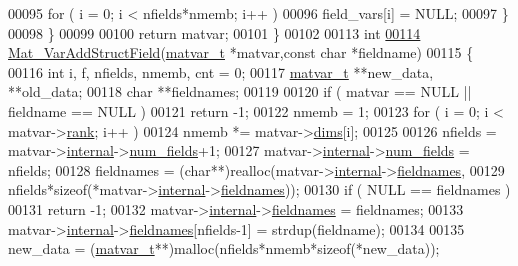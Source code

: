 \begin{DoxyCode}
00095             for ( i = 0; i < nfields*nmemb; i++ )
00096                 field\_vars[i] = NULL;
00097         \}
00098     \}
00099 
00100     \textcolor{keywordflow}{return} matvar;
00101 \}
00102 
00113 \textcolor{keywordtype}{int}
\hyperlink{group___m_a_t_gaef5689cace7c4165c3cbf8fa17d1ebcd}{00114} \hyperlink{group___m_a_t_gaef5689cace7c4165c3cbf8fa17d1ebcd}{Mat\_VarAddStructField}(\hyperlink{group___m_a_t_structmatvar__t}{matvar\_t} *matvar,\textcolor{keyword}{const} \textcolor{keywordtype}{char} *fieldname)
00115 \{
00116     \textcolor{keywordtype}{int}       i, f, nfields, nmemb, cnt = 0;
00117     \hyperlink{group___m_a_t_structmatvar__t}{matvar\_t} **new\_data, **old\_data;
00118     \textcolor{keywordtype}{char}     **fieldnames;
00119 
00120     \textcolor{keywordflow}{if} ( matvar == NULL || fieldname == NULL )
00121         \textcolor{keywordflow}{return} -1;
00122     nmemb = 1;
00123     \textcolor{keywordflow}{for} ( i = 0; i < matvar->\hyperlink{group___m_a_t_a84ba70c96ded13cc555fa75b768d9921}{rank}; i++ )
00124         nmemb *= matvar->\hyperlink{group___m_a_t_a8e01234e1c862ce3472bb37f5a09b92c}{dims}[i];
00125 
00126     nfields = matvar->\hyperlink{group___m_a_t_a6e97e3ed9f40c49322c18561c2a94e92}{internal}->\hyperlink{structmatvar__internal_a93fc447484f455eddf9334f2e9e411c2}{num\_fields}+1;
00127     matvar->\hyperlink{group___m_a_t_a6e97e3ed9f40c49322c18561c2a94e92}{internal}->\hyperlink{structmatvar__internal_a93fc447484f455eddf9334f2e9e411c2}{num\_fields} = nfields;
00128     fieldnames = (\textcolor{keywordtype}{char}**)realloc(matvar->\hyperlink{group___m_a_t_a6e97e3ed9f40c49322c18561c2a94e92}{internal}->\hyperlink{structmatvar__internal_a7574d000bfc98ad4860ae6590b8d4985}{fieldnames},
00129         nfields*\textcolor{keyword}{sizeof}(*matvar->\hyperlink{group___m_a_t_a6e97e3ed9f40c49322c18561c2a94e92}{internal}->\hyperlink{structmatvar__internal_a7574d000bfc98ad4860ae6590b8d4985}{fieldnames}));
00130     \textcolor{keywordflow}{if} ( NULL == fieldnames )
00131         \textcolor{keywordflow}{return} -1;
00132     matvar->\hyperlink{group___m_a_t_a6e97e3ed9f40c49322c18561c2a94e92}{internal}->\hyperlink{structmatvar__internal_a7574d000bfc98ad4860ae6590b8d4985}{fieldnames} = fieldnames;
00133     matvar->\hyperlink{group___m_a_t_a6e97e3ed9f40c49322c18561c2a94e92}{internal}->\hyperlink{structmatvar__internal_a7574d000bfc98ad4860ae6590b8d4985}{fieldnames}[nfields-1] = strdup(fieldname);
00134 
00135     new\_data = (\hyperlink{group___m_a_t_structmatvar__t}{matvar\_t}**)malloc(nfields*nmemb*\textcolor{keyword}{sizeof}(*new\_data));

\end{DoxyCode}
